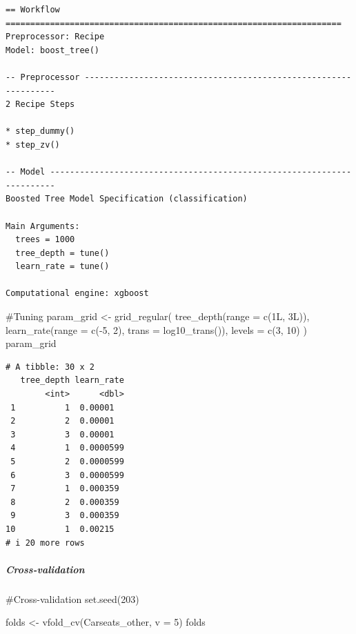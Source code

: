 \documentclass[
]{article}
\let\oldsubparagraph\subparagraph
\renewcommand{\subparagraph}[1]{\oldsubparagraph{#1}\mbox{}}
\newenvironment{Shaded}{\begin{snugshade}}{\end{snugshade}}
\newcommand{\AttributeTok}[1]{\textcolor[rgb]{0.40,0.45,0.13}{#1}}
\newcommand{\CommentTok}[1]{\textcolor[rgb]{0.37,0.37,0.37}{#1}}
\newcommand{\DecValTok}[1]{\textcolor[rgb]{0.68,0.00,0.00}{#1}}
\newcommand{\FunctionTok}[1]{\textcolor[rgb]{0.28,0.35,0.67}{#1}}
\newcommand{\NormalTok}[1]{\textcolor[rgb]{0.00,0.23,0.31}{#1}}
\newcommand{\OtherTok}[1]{\textcolor[rgb]{0.00,0.23,0.31}{#1}}
\newcommand{\SpecialCharTok}[1]{\textcolor[rgb]{0.37,0.37,0.37}{#1}}
\begin{document}
\begin{verbatim}
== Workflow ====================================================================
Preprocessor: Recipe
Model: boost_tree()

-- Preprocessor ----------------------------------------------------------------
2 Recipe Steps

* step_dummy()
* step_zv()

-- Model -----------------------------------------------------------------------
Boosted Tree Model Specification (classification)

Main Arguments:
  trees = 1000
  tree_depth = tune()
  learn_rate = tune()

Computational engine: xgboost 
\end{verbatim}

\begin{Shaded}
\begin{Highlighting}[]
\CommentTok{\#Tuning}
\NormalTok{param\_grid }\OtherTok{\textless{}{-}} \FunctionTok{grid\_regular}\NormalTok{(}
  \FunctionTok{tree\_depth}\NormalTok{(}\AttributeTok{range =} \FunctionTok{c}\NormalTok{(1L, 3L)),}
  \FunctionTok{learn\_rate}\NormalTok{(}\AttributeTok{range =} \FunctionTok{c}\NormalTok{(}\SpecialCharTok{{-}}\DecValTok{5}\NormalTok{, }\DecValTok{2}\NormalTok{), }\AttributeTok{trans =} \FunctionTok{log10\_trans}\NormalTok{()),}
  \AttributeTok{levels =} \FunctionTok{c}\NormalTok{(}\DecValTok{3}\NormalTok{, }\DecValTok{10}\NormalTok{)}
\NormalTok{  )}
\NormalTok{param\_grid}
\end{Highlighting}
\end{Shaded}

\begin{verbatim}
# A tibble: 30 x 2
   tree_depth learn_rate
        <int>      <dbl>
 1          1  0.00001  
 2          2  0.00001  
 3          3  0.00001  
 4          1  0.0000599
 5          2  0.0000599
 6          3  0.0000599
 7          1  0.000359 
 8          2  0.000359 
 9          3  0.000359 
10          1  0.00215  
# i 20 more rows
\end{verbatim}

\hypertarget{cross-validation-2}{%
\subparagraph{Cross-validation}\label{cross-validation-2}}

\begin{Shaded}
\begin{Highlighting}[]
\CommentTok{\#Cross{-}validation}
\FunctionTok{set.seed}\NormalTok{(}\DecValTok{203}\NormalTok{)}

\NormalTok{folds }\OtherTok{\textless{}{-}} \FunctionTok{vfold\_cv}\NormalTok{(Carseats\_other, }\AttributeTok{v =} \DecValTok{5}\NormalTok{)}
\NormalTok{folds}
\end{Highlighting}
\end{Shaded}
\end{document}
